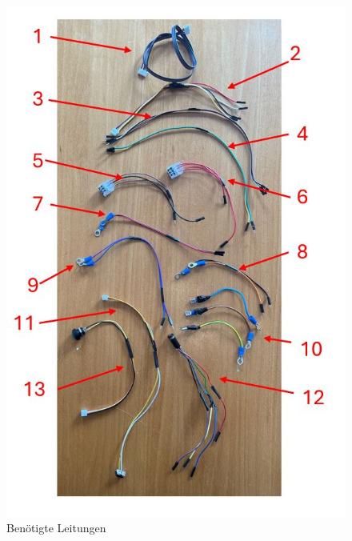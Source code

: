 \begin{figure}[H]
	\begin{center}
		\includegraphics[width=\textwidth]{Images/Leitungen.jpg}
		\caption{Benötigte Leitungen} \label{Leitungen}
	\end{center}
\end{figure}

